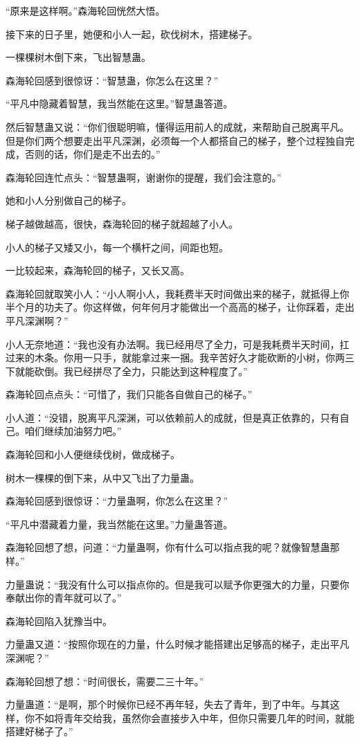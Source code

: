 \begin{this_body}
“原来是这样啊。”森海轮回恍然大悟。

接下来的日子里，她便和小人一起，砍伐树木，搭建梯子。

一棵棵树木倒下来，飞出智慧蛊。

森海轮回感到很惊讶：“智慧蛊，你怎么在这里？”

“平凡中隐藏着智慧，我当然能在这里。”智慧蛊答道。

然后智慧蛊又说：“你们很聪明嘛，懂得运用前人的成就，来帮助自己脱离平凡。但是你们两个想要走出平凡深渊，必须每一个人都搭自己的梯子，整个过程独自完成，否则的话，你们是走不出去的。”

森海轮回连忙点头：“智慧蛊啊，谢谢你的提醒，我们会注意的。”

她和小人分别做自己的梯子。

梯子越做越高，很快，森海轮回的梯子就超越了小人。

小人的梯子又矮又小，每一个横杆之间，间距也短。

一比较起来，森海轮回的梯子，又长又高。

森海轮回就取笑小人：“小人啊小人，我耗费半天时间做出来的梯子，就抵得上你半个月的功夫了。你这样做，何年何月才能做出一个高高的梯子，让你踩着，走出平凡深渊啊？”

小人无奈地道：“我也没有办法啊。我已经用尽了全力，可是我耗费半天时间，扛过来的木条。你用一只手，就能拿过来一捆。我辛苦好久才能砍断的小树，你两三下就能砍倒。我已经拼尽了全力，只能达到这种程度了。”

森海轮回点点头：“可惜了，我们只能各自做自己的梯子。”

小人道：“没错，脱离平凡深渊，可以依赖前人的成就，但是真正依靠的，只有自己。咱们继续加油努力吧。”

森海轮回和小人便继续伐树，做成梯子。

树木一棵棵的倒下来，从中又飞出了力量蛊。

森海轮回感到很惊讶：“力量蛊啊，你怎么在这里？”

“平凡中潜藏着力量，我当然能在这里。”力量蛊答道。

森海轮回想了想，问道：“力量蛊啊，你有什么可以指点我的呢？就像智慧蛊那样。”

力量蛊说：“我没有什么可以指点你的。但是我可以赋予你更强大的力量，只要你奉献出你的青年就可以了。”

森海轮回陷入犹豫当中。

力量蛊又道：“按照你现在的力量，什么时候才能搭建出足够高的梯子，走出平凡深渊呢？”

森海轮回想了想：“时间很长，需要二三十年。”

力量蛊道：“是啊，那个时候你已经不再年轻，失去了青年，到了中年。与其这样，你不如将青年交给我，虽然你会直接步入中年，但你只需要几年的时间，就能搭建好梯子了。”


\end{this_body}
